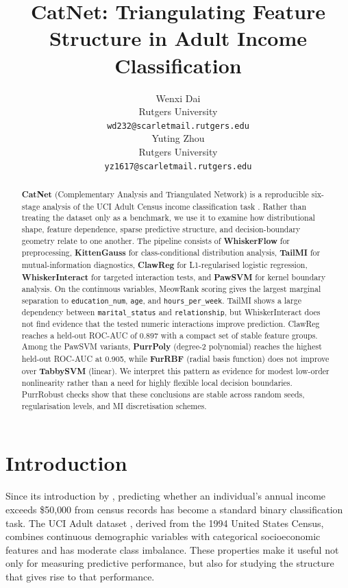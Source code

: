 \documentclass[11pt]{article}
\title{CatNet: Triangulating Feature Structure in Adult Income Classification}
\author{Wenxi Dai \\
  Rutgers University \\
  \texttt{wd232@scarletmail.rutgers.edu} \\\And
  Yuting Zhou \\
  Rutgers University \\
  \texttt{yz1617@scarletmail.rutgers.edu}}
\begin{document}
\maketitle

\begin{abstract}

\textbf{CatNet} (Complementary Analysis and Triangulated Network) is a reproducible six-stage analysis of the UCI Adult Census income classification task \citep{uci_adult}. Rather than treating the dataset only as a benchmark, we use it to examine how distributional shape, feature dependence, sparse predictive structure, and decision-boundary geometry relate to one another. The pipeline consists of \textbf{WhiskerFlow} for preprocessing, \textbf{KittenGauss} for class-conditional distribution analysis, \textbf{TailMI} for mutual-information diagnostics, \textbf{ClawReg} for L1-regularised logistic regression, \textbf{WhiskerInteract} for targeted interaction tests, and \textbf{PawSVM} for kernel boundary analysis. On the continuous variables, MeowRank scoring gives the largest marginal separation to \texttt{education\_num}, \texttt{age}, and \texttt{hours\_per\_week}. TailMI shows a large dependency between \texttt{marital\_status} and \texttt{relationship}, but WhiskerInteract does not find evidence that the tested numeric interactions improve prediction. ClawReg reaches a held-out ROC-AUC of 0.897 with a compact set of stable feature groups. Among the PawSVM variants, \textbf{PurrPoly} (degree-2 polynomial) reaches the highest held-out ROC-AUC at 0.905, while \textbf{FurRBF} (radial basis function) does not improve over \textbf{TabbySVM} (linear). We interpret this pattern as evidence for modest low-order nonlinearity rather than a need for highly flexible local decision boundaries. PurrRobust checks show that these conclusions are stable across random seeds, regularisation levels, and MI discretisation schemes.

\end{abstract}

\section{Introduction}

Since its introduction by \citet{kohavi1996scaling}, predicting whether an individual's annual income exceeds \$50{,}000 from census records has become a standard binary classification task. The UCI Adult dataset \citep{uci_adult}, derived from the 1994 United States Census, combines continuous demographic variables with categorical socioeconomic features and has moderate class imbalance. These properties make it useful not only for measuring predictive performance, but also for studying the structure that gives rise to that performance.
\end{document}
